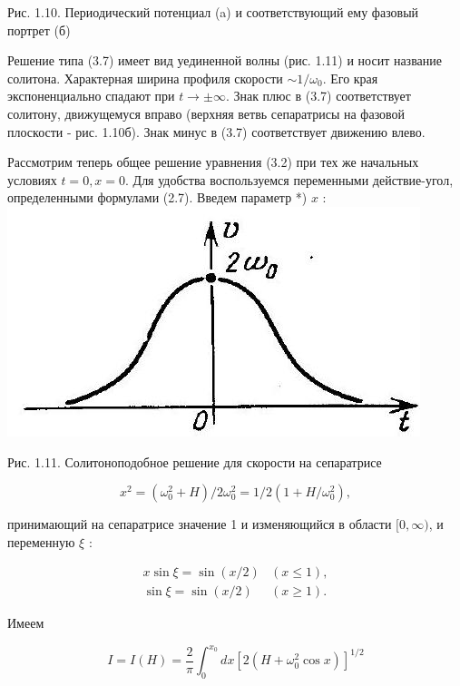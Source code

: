 \documentclass[10pt]{article}
\begin{document}
Рис. 1.10. Периодический потенциал (a) и соответствующий ему фазовый портрет (б)

Решение типа (3.7) имеет вид уединенной волны (рис. 1.11) и носит название солитона. Характерная ширина профиля скорости $\sim 1 / \omega_{0}$. Его края экспоненциально спадают при $t \rightarrow \pm \infty$. Знак плюс в (3.7) соответствует солитону, движущемуся вправо (верхняя ветвь сепаратрисы на фазовой плоскости - рис. 1.10б). Знак минус в (3.7) соответствует движению влево.

Рассмотрим теперь общее решение уравнения (3.2) при тех же начальных условиях $t=0, x=0$. Для удобства воспользуемся переменными действие-угол, определенными формулами (2.7). Введем параметр *) $x$ :\\
\includegraphics[max width=\textwidth, center]{2024_12_13_2abbd56e24043f80c30dg-2}

Рис. 1.11. Солитоноподобное решение для скорости на сепаратрисе


\begin{equation*}
x^{2}=\left(\omega_{0}^{2}+H\right) / 2 \omega_{0}^{2}=1 / 2\left(1+H / \omega_{0}^{2}\right), \tag{3.8}
\end{equation*}


принимающий на сепаратрисе значение 1 и изменяющийся в области $[0, \infty)$, и переменную $\xi$ :


\begin{align*}
x \sin \xi=\sin (x / 2) & (x \leqslant 1),  \tag{3.9}\\
\sin \xi=\sin (x / 2) & (x \geqslant 1) .
\end{align*}


Имеем

$$
I=I(H)=\frac{2}{\pi} \int_{0}^{x_{0}} d x\left[2\left(H+\omega_{0}^{2} \cos x\right)\right]^{1 / 2}
$$
\end{document}
